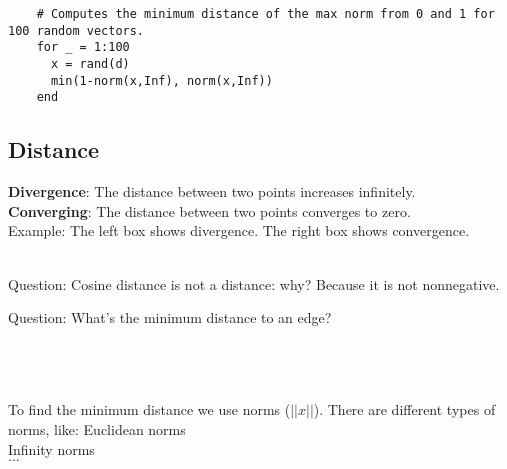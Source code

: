 \begin{tcolorbox}[width=\textwidth, left=-6mm, sharp corners, boxrule=0pt]
  \begin{verbatim}
    # Computes the minimum distance of the max norm from 0 and 1 for 100 random vectors.
    for _ = 1:100
      x = rand(d)
      min(1-norm(x,Inf), norm(x,Inf))
    end
  \end{verbatim}
\end{tcolorbox}

\subsection{Distance}
\textbf{Divergence}: The distance between two points increases infinitely.\\
\textbf{Converging}: The distance between two points converges to zero. \\

Example: The left box shows divergence. The right box shows convergence.\\
 \\

Question: Cosine distance is not a distance: why?
Because it is not nonnegative. 

Question: What's the minimum distance to an edge? \\\\
 \\\\
To find the minimum distance we use norms ($||x||$). There are different types of norms, like:
Euclidean norms\\
Infinity norms\\
$\dots$ \\

